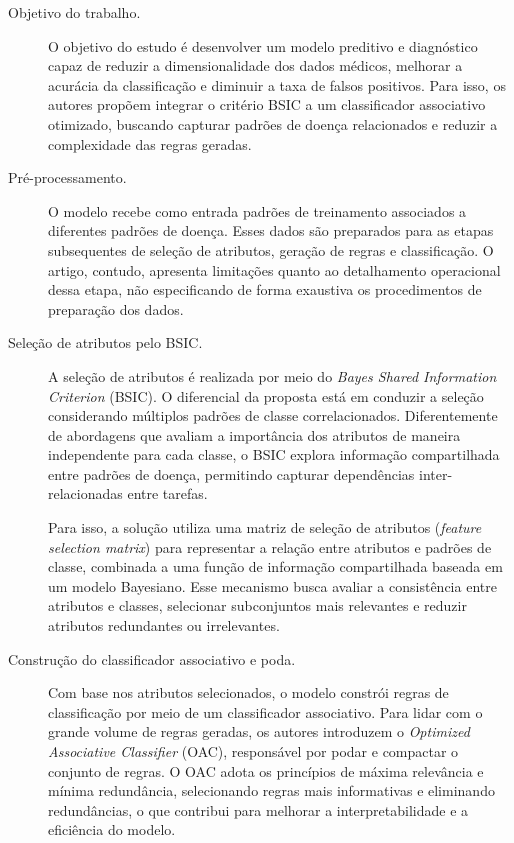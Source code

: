 \begin{description}
    \item[Objetivo do trabalho.] O objetivo do estudo é desenvolver um modelo preditivo e diagnóstico capaz de reduzir a dimensionalidade dos dados médicos, melhorar a acurácia da classificação e diminuir a taxa de falsos positivos. Para isso, os autores propõem integrar o critério BSIC a um classificador associativo otimizado, buscando capturar padrões de doença relacionados e reduzir a complexidade das regras geradas.

    \item[Pré-processamento.] O modelo recebe como entrada padrões de treinamento associados a diferentes padrões de doença. Esses dados são preparados para as etapas subsequentes de seleção de atributos, geração de regras e classificação. O artigo, contudo, apresenta limitações quanto ao detalhamento operacional dessa etapa, não especificando de forma exaustiva os procedimentos de preparação dos dados.

    \item[Seleção de atributos pelo BSIC.] A seleção de atributos é realizada por meio do \textit{Bayes Shared Information Criterion} (BSIC). O diferencial da proposta está em conduzir a seleção considerando múltiplos padrões de classe correlacionados. Diferentemente de abordagens que avaliam a importância dos atributos de maneira independente para cada classe, o BSIC explora informação compartilhada entre padrões de doença, permitindo capturar dependências inter-relacionadas entre tarefas.

    Para isso, a solução utiliza uma matriz de seleção de atributos (\textit{feature selection matrix}) para representar a relação entre atributos e padrões de classe, combinada a uma função de informação compartilhada baseada em um modelo Bayesiano. Esse mecanismo busca avaliar a consistência entre atributos e classes, selecionar subconjuntos mais relevantes e reduzir atributos redundantes ou irrelevantes.

    \item[Construção do classificador associativo e poda.] Com base nos atributos selecionados, o modelo constrói regras de classificação por meio de um classificador associativo. Para lidar com o grande volume de regras geradas, os autores introduzem o \textit{Optimized Associative Classifier} (OAC), responsável por podar e compactar o conjunto de regras. O OAC adota os princípios de máxima relevância e mínima redundância, selecionando regras mais informativas e eliminando redundâncias, o que contribui para melhorar a interpretabilidade e a eficiência do modelo.


\end{description}
